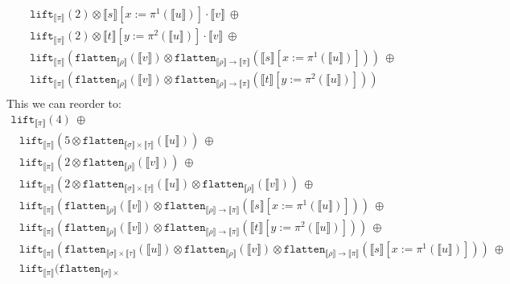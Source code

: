 \documentclass[a4paper,UKenglish,cleveref,autoref,numberwithinsect]{lipics-v2019}
\theoremstyle{definition}
\newcommand{\arrtype}{\rightarrow}
\newcommand{\flatten}{\mathtt{flatten}}
\newcommand{\lift}{\mathtt{lift}}
\newcommand{\typeinterpret}[1]{\llbracket #1 \rrbracket}
\newcommand{\interpret}[1]{\llbracket #1 \rrbracket}
\begin{document}
\begin{itemize}
\[\begin{array}{l}
  \phantom{A}
  \lift_{\typeinterpret{\pi}}(2) \otimes \interpret{s}[x:=\pi^1(
    \interpret{u})] \cdot \interpret{v}\ \oplus \\
  \phantom{A}
  \lift_{\typeinterpret{\pi}}(2) \otimes \interpret{t}[y:=\pi^2(
    \interpret{u})] \cdot \interpret{v}\ \oplus \\
  \phantom{A}
  \lift_{\typeinterpret{\pi}}(
    \flatten_{\typeinterpret{\rho}}(\interpret{v}) \otimes
    \flatten_{\typeinterpret{\rho} \arrtype \typeinterpret{\pi}}(
    \interpret{s}[x:=\pi^1(\interpret{u})]))\ \oplus \\
  \phantom{A}
  \lift_{\typeinterpret{\pi}}(
    \flatten_{\typeinterpret{\rho}}(\interpret{v}) \otimes
    \flatten_{\typeinterpret{\rho} \arrtype
    \typeinterpret{\pi}}(\interpret{t}[y:=\pi^2(\interpret{u})])) \\
  \end{array}
  \]
  This we can reorder to:
  \[
  \begin{array}{l}
  \lift_{\typeinterpret{\pi}}(4)\ \oplus \\
  \phantom{A}
  \lift_{\typeinterpret{\pi}}(5 \otimes \flatten_{\typeinterpret{\sigma}
    \times \typeinterpret{\tau}}(\interpret{u}))\ \oplus \\
  \phantom{A}
  \lift_{\typeinterpret{\pi}}(2 \otimes \flatten_{
    \typeinterpret{\rho}}(\interpret{v}))\ \oplus \\
  \phantom{A}
  \lift_{\typeinterpret{\pi}}(2 \otimes
    \flatten_{\typeinterpret{\sigma} \times
    \typeinterpret{\tau}}(\interpret{u}) \otimes
    \flatten_{\typeinterpret{\rho}}(\interpret{v}))\ \oplus \\
  \phantom{A}
  \lift_{\typeinterpret{\pi}}(
    \flatten_{\typeinterpret{\rho}}(\interpret{v}) \otimes
    \flatten_{\typeinterpret{\rho} \arrtype \typeinterpret{\pi}}(
    \interpret{s}[x:=\pi^1(\interpret{u})]))\ \oplus \\
  \phantom{A}
  \lift_{\typeinterpret{\pi}}(
    \flatten_{\typeinterpret{\rho}}(\interpret{v}) \otimes
    \flatten_{\typeinterpret{\rho} \arrtype
    \typeinterpret{\pi}}(\interpret{t}[y:=\pi^2(\interpret{u})]))\ 
    \oplus \\
  \phantom{A}
  \lift_{\typeinterpret{\pi}}(\flatten_{\typeinterpret{\sigma} \times
    \typeinterpret{\tau}}(\interpret{u}) \otimes
    \flatten_{\typeinterpret{\rho}}(\interpret{v}) \otimes
    \flatten_{\typeinterpret{\rho} \arrtype \typeinterpret{\pi}}(
    \interpret{s}[x:=\pi^1(\interpret{u})]))\ \oplus \\
  \phantom{A}
  \lift_{\typeinterpret{\pi}}(\flatten_{\typeinterpret{\sigma} \times
}
\end{array}\]
\end{itemize}
\end{document}
